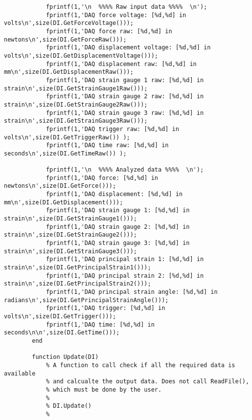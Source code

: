 \begin{lstlisting}
            fprintf(1,'\n  %%%% Raw input data %%%%  \n');
            fprintf(1,'DAQ force voltage: [%d,%d] in volts\n',size(DI.GetForceVoltage()));
            fprintf(1,'DAQ force raw: [%d,%d] in newtons\n',size(DI.GetForceRaw()));
            fprintf(1,'DAQ displacement voltage: [%d,%d] in volts\n',size(DI.GetDisplacementVoltage()));
            fprintf(1,'DAQ displacement raw: [%d,%d] in mm\n',size(DI.GetDisplacementRaw()));
            fprintf(1,'DAQ strain gauge 1 raw: [%d,%d] in strain\n',size(DI.GetStrainGauge1Raw()));
            fprintf(1,'DAQ strain gauge 2 raw: [%d,%d] in strain\n',size(DI.GetStrainGauge2Raw()));
            fprintf(1,'DAQ strain gauge 3 raw: [%d,%d] in strain\n',size(DI.GetStrainGauge3Raw()));
            fprintf(1,'DAQ trigger raw: [%d,%d] in volts\n',size(DI.GetTriggerRaw()) );
            fprintf(1,'DAQ time raw: [%d,%d] in seconds\n',size(DI.GetTimeRaw()) );
            
            fprintf(1,'\n  %%%% Analyzed data %%%%  \n');
            fprintf(1,'DAQ force: [%d,%d] in newtons\n',size(DI.GetForce()));
            fprintf(1,'DAQ displacement: [%d,%d] in mm\n',size(DI.GetDisplacement()));
            fprintf(1,'DAQ strain gauge 1: [%d,%d] in strain\n',size(DI.GetStrainGauge1()));
            fprintf(1,'DAQ strain gauge 2: [%d,%d] in strain\n',size(DI.GetStrainGauge2()));
            fprintf(1,'DAQ strain gauge 3: [%d,%d] in strain\n',size(DI.GetStrainGauge3()));
            fprintf(1,'DAQ principal strain 1: [%d,%d] in strain\n',size(DI.GetPrincipalStrain1()));
            fprintf(1,'DAQ principal strain 2: [%d,%d] in strain\n',size(DI.GetPrincipalStrain2()));
            fprintf(1,'DAQ principal strain angle: [%d,%d] in radians\n',size(DI.GetPrincipalStrainAngle()));
            fprintf(1,'DAQ trigger: [%d,%d] in volts\n',size(DI.GetTrigger()));
            fprintf(1,'DAQ time: [%d,%d] in seconds\n\n',size(DI.GetTime()));
        end
        
        function Update(DI)
            % A function to call check if all the required data is available
            % and calcualte the output data. Does not call ReadFile(),
            % which must be done by the user.
            %
            % DI.Update()
            %
            

\end{lstlisting}
